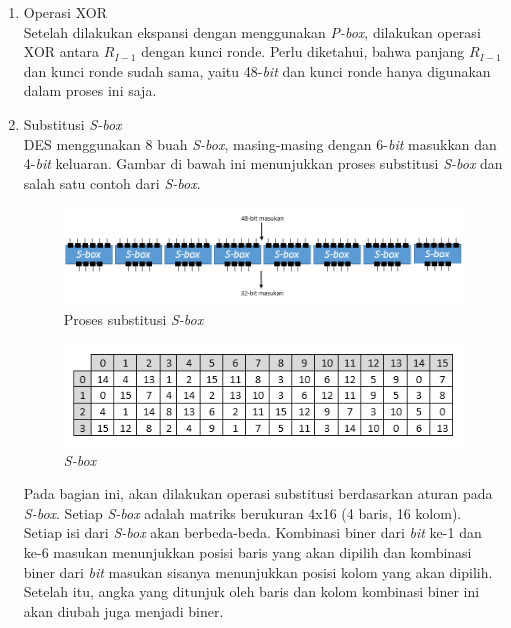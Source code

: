 \begin{enumerate}
	\item Operasi XOR\\
	Setelah dilakukan ekspansi dengan menggunakan \textit{P-box}, dilakukan operasi XOR antara \begin{math}R_{I-1}\end{math} dengan kunci ronde. Perlu diketahui, bahwa panjang \begin{math}R_{I-1}\end{math} dan kunci ronde sudah sama, yaitu 48-\textit{bit} dan kunci ronde hanya digunakan dalam proses ini saja.

	\item Substitusi \textit{S-box}\\
	DES menggunakan 8 buah \textit{S-box}, masing-masing dengan 6-\textit{bit} masukkan dan 4-\textit{bit} keluaran. Gambar di bawah ini menunjukkan proses substitusi \textit{S-box} dan salah satu contoh dari \textit{S-box}.
	
\begin{figure}[h]
	\includegraphics[scale=0.7]{Gambar/S-box}
	\centering
	\caption{Proses substitusi \textit{S-box}}
\end{figure}
	
\begin{figure}[ht]
	\includegraphics[scale=0.8]{Gambar/S-box1}
	\centering
	\caption{\textit{S-box}}
\end{figure}

	Pada bagian ini, akan dilakukan operasi substitusi berdasarkan aturan pada \textit{S-box}. Setiap \textit{S-box} adalah matriks berukuran 4x16 (4 baris, 16 kolom). Setiap isi dari \textit{S-box} akan berbeda-beda. Kombinasi biner dari \textit{bit} ke-1 dan ke-6 masukan menunjukkan posisi baris yang akan dipilih dan kombinasi biner dari \textit{bit} masukan sisanya menunjukkan posisi kolom yang akan dipilih. Setelah itu, angka yang ditunjuk oleh baris dan kolom kombinasi biner ini akan diubah juga menjadi biner.


\end{enumerate}
